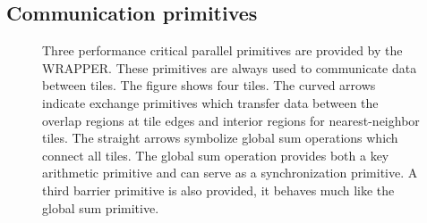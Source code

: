 \subsection{Communication primitives}
\label{sec:communication_primitives}

\begin{figure}
\begin{center}
\end{center}
\caption{Three performance critical parallel primitives are provided
by the WRAPPER. These primitives are always used to communicate data
between tiles. The figure shows four tiles. The curved arrows indicate
exchange primitives which transfer data between the overlap regions at tile
edges and interior regions for nearest-neighbor tiles.
The straight arrows symbolize global sum operations which connect all tiles.
The global sum operation provides both a key arithmetic primitive and can
serve as a synchronization primitive. A third barrier primitive is also
provided, it behaves much like the global sum primitive.
} \label{fig:communication_primitives}
\end{figure}


